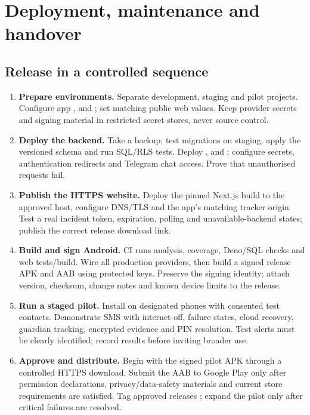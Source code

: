 \section{Deployment, maintenance and handover}

\subsection{Release in a controlled sequence}
\begin{enumerate}
\item \textbf{Prepare environments.} Separate development, staging and pilot projects. Configure app ,  and ; set matching public web values. Keep provider secrets and signing material in restricted secret stores, never source control.
\item \textbf{Deploy the backend.} Take a backup; test migrations on staging, apply the versioned schema and run SQL/RLS tests. Deploy ,  and ; configure secrets, authentication redirects and Telegram chat access. Prove that unauthorised requests fail. 
\item \textbf{Publish the HTTPS website.} Deploy the pinned Next.js build to the approved host, configure DNS/TLS and the app's matching tracker origin. Test a real incident token, expiration, polling and unavailable-backend states; publish the correct release download link.
\item \textbf{Build and sign Android.} CI runs analysis, coverage, Deno/SQL checks and web tests/build. Wire all production providers, then build a signed release APK and AAB using protected keys. Preserve the signing identity; attach version, checksum, change notes and known device limits to the release.
\item \textbf{Run a staged pilot.} Install on designated phones with consented test contacts. Demonstrate SMS with internet off, failure states, cloud recovery, guardian tracking, encrypted evidence and PIN resolution. Test alerts must be clearly identified; record results before inviting broader use.
\item \textbf{Approve and distribute.} Begin with the signed pilot APK through a controlled HTTPS download. Submit the AAB to Google Play only after permission declarations, privacy/data-safety materials and current store requirements are satisfied. Tag approved releases ; expand the pilot only after critical failures are resolved.
\end{enumerate}

